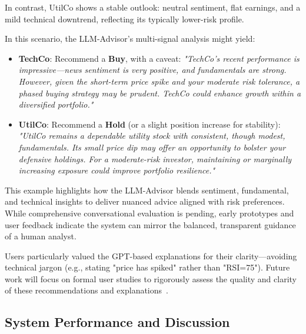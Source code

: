 \documentclass[conference]{IEEEtran}
\begin{document}
In contrast, UtilCo shows a stable outlook: neutral sentiment, flat earnings, and a mild technical downtrend, reflecting its typically lower-risk profile.

In this scenario, the LLM-Advisor’s multi-signal analysis might yield:

\begin{itemize}
  \item \textbf{TechCo}: Recommend a \textbf{Buy}, with a caveat: \textit{"TechCo’s recent performance is impressive—news sentiment is very positive, and fundamentals are strong. However, given the short-term price spike and your moderate risk tolerance, a phased buying strategy may be prudent. TechCo could enhance growth within a diversified portfolio."}
  \item \textbf{UtilCo}: Recommend a \textbf{Hold} (or a slight position increase for stability): \textit{"UtilCo remains a dependable utility stock with consistent, though modest, fundamentals. Its small price dip may offer an opportunity to bolster your defensive holdings. For a moderate-risk investor, maintaining or marginally increasing exposure could improve portfolio resilience."}
\end{itemize}

This example highlights how the LLM-Advisor blends sentiment, fundamental, and technical insights to deliver nuanced advice aligned with risk preferences. While comprehensive conversational evaluation is pending, early prototypes and user feedback indicate the system can mirror the balanced, transparent guidance of a human analyst.

Users particularly valued the GPT-based explanations for their clarity—avoiding technical jargon (e.g., stating "price has spiked" rather than "RSI=75"). Future work will focus on formal user studies to rigorously assess the quality and clarity of these recommendations and explanations~\cite{fieberg2023}.


\subsection{System Performance and Discussion}
\end{document}
